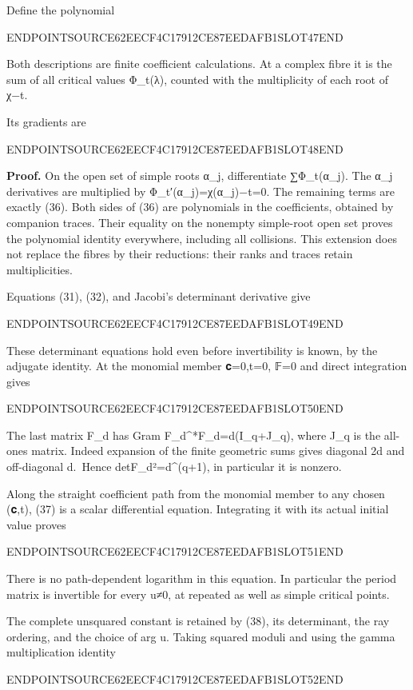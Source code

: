 Define the polynomial

ENDPOINTSOURCE62EECF4C17912CE87EEDAFB1SLOT47END

Both descriptions are finite coefficient calculations. At a complex fibre it is the sum of all critical values Φ\_t(λ), counted with the multiplicity of each root of χ−t.

Its gradients are

ENDPOINTSOURCE62EECF4C17912CE87EEDAFB1SLOT48END

\textbf{Proof.} On the open set of simple roots α\_j, differentiate ∑Φ\_t(α\_j). The α\_j derivatives are multiplied by Φ\_t′(α\_j)=χ(α\_j)−t=0. The remaining terms are exactly (36). Both sides of (36) are polynomials in the coefficients, obtained by companion traces. Their equality on the nonempty simple-root open set proves the polynomial identity everywhere, including all collisions. This extension does not replace the fibres by their reductions: their ranks and traces retain multiplicities.

Equations (31), (32), and Jacobi's determinant derivative give

ENDPOINTSOURCE62EECF4C17912CE87EEDAFB1SLOT49END

These determinant equations hold even before invertibility is known, by the adjugate identity. At the monomial member 𝐜=0,t=0, 𝔽=0 and direct integration gives

ENDPOINTSOURCE62EECF4C17912CE87EEDAFB1SLOT50END

The last matrix F\_d has Gram F\_d\^{}*F\_d=d(I\_q+J\_q), where J\_q is the all-ones matrix. Indeed expansion of the finite geometric sums gives diagonal 2d and off-diagonal d.~Hence \textbar detF\_d\textbar²=d\^{}(q+1), in particular it is nonzero.

Along the straight coefficient path from the monomial member to any chosen (𝐜,t), (37) is a scalar differential equation. Integrating it with its actual initial value proves

ENDPOINTSOURCE62EECF4C17912CE87EEDAFB1SLOT51END

There is no path-dependent logarithm in this equation. In particular the period matrix is invertible for every u≠0, at repeated as well as simple critical points.

The complete unsquared constant is retained by (38), its determinant, the ray ordering, and the choice of arg u. Taking squared moduli and using the gamma multiplication identity

ENDPOINTSOURCE62EECF4C17912CE87EEDAFB1SLOT52END

